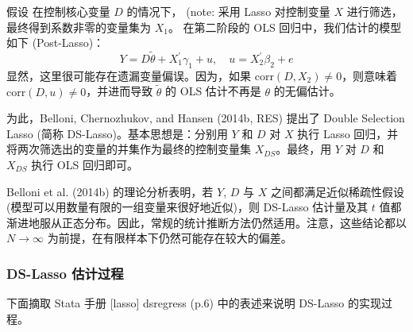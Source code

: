假设%
在控制核心变量 $D$ 的情况下， (note: %
采用 Lasso 对控制变量 $X$ 进行筛选，最终得到系数非零的变量集为 $X_1$。
在第二阶段的 OLS 回归中，我们估计的模型如下 (Post-Lasso)：
\begin{equation}\label{eq:lasso-DS-02}
Y =D \widetilde{\theta} + X_1^{\prime} \gamma_1 + u, \quad u= X_2^{\prime} \beta_2 + e
\end{equation}
显然，这里很可能存在遗漏变量偏误。因为，如果 $\mathrm{corr}(D,X_2) \neq 0$，则意味着 $\mathrm{corr}(D,u)\neq 0$，并进而导致 ${\widetilde{\theta}}$ 的 OLS 估计不再是 $\theta$ 的无偏估计。 

为此，Belloni, Chernozhukov, and Hansen (2014b, RES) 提出了 Double Selection Lasso (简称 DS-Lasso)。基本思想是：分别用 $Y$ 和 $D$ 对 $X$ 执行 Lasso 回归，并将两次筛选出的变量的并集作为最终的控制变量集 $X_{DS}$。最终，用 $Y$ 对 $D$ 和 $X_{DS}$ 执行 OLS 回归即可。

Belloni et al. (2014b) 的理论分析表明，若 $Y$, $D$ 与 $X$ 之间都满足近似稀疏性假设 (模型可以用数量有限的一组变量来很好地近似)，则 DS-Lasso 估计量及其 $t$ 值都渐进地服从正态分布。因此，常规的统计推断方法仍然适用。注意，这些结论都以 $N \to \infty$ 为前提，在有限样本下仍然可能存在较大的偏差。%

%


\subsubsection{DS-Lasso 估计过程}
下面摘取 Stata 手册 [lasso] dsregress (p.6) 中的表述来说明 DS-Lasso 的实现过程。

